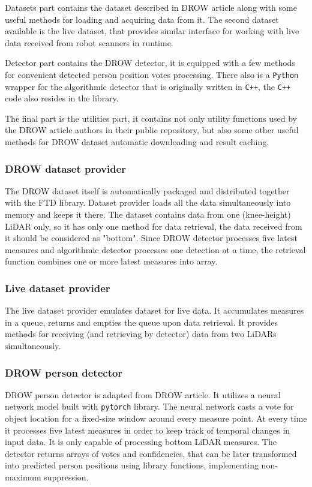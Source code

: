 \documentclass{article}
\begin{document}
Datasets part contains the dataset described in DROW article along with some useful methods for loading and acquiring data from it.
The second dataset available is the live dataset, that provides similar interface for working with live data received from robot scanners in runtime.

Detector part contains the DROW detector, it is equipped with a few methods for convenient detected person position votes processing.
There also is a \texttt{Python} wrapper for the algorithmic detector that is originally written in \texttt{C++}, the \texttt{C++} code also resides in the library.

The final part is the utilities part, it contains not only utility functions used by the DROW article authors in their public repository, but also some other useful methods for DROW dataset automatic downloading and result caching.

\subsubsection{DROW dataset provider}

The DROW dataset itself is automatically packaged and distributed together with the FTD library.
Dataset provider loads all the data simultaneously into memory and keeps it there.
The dataset contains data from one (knee-height) LiDAR only, so it has only one method for data retrieval, the data received from it should be considered as "bottom".
Since DROW detector processes five latest measures and algorithmic detector processes one detection at a time, the retrieval function combines one or more latest measures into array.

\subsubsection{Live dataset provider}

The live dataset provider emulates dataset for live data.
It accumulates measures in a queue, returns and empties the queue upon data retrieval.
It provides methods for receiving (and retrieving by detector) data from two LiDARs simultaneously.

\subsubsection{DROW person detector}

DROW person detector is adapted from DROW\cite{DROW_2018} article.
It utilizes a neural network model built with \texttt{pytorch}\cite{pytorch_site} library.
The neural network casts a vote for object location for a fixed-size window around every measure point.
At every time it processes five latest measures in order to keep track of temporal changes in input data.
It is only capable of processing bottom LiDAR measures.
The detector returns arrays of votes and confidencies, that can be later transformed into predicted person positions using library functions, implementing non-maximum suppression.
\end{document}
